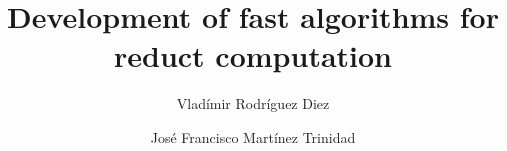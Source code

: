 \documentclass[authoryear,11pt]{elsarticle}
\begin{document}
	
	\title{Development of fast algorithms for reduct computation}
	
	\author{Vlad\'imir Rodr\'iguez Diez}
	\author{Jos\'e Francisco Mart\'inez Trinidad}
	
	\address{Computer Science Department\\National Institute of
	Astrophysics, Optics and Electronics\\
	Luis Enrique Erro \# 1, Santa Mar\'{\i}a Tonantzintla, Puebla,
	72840, M\'{e}xico} 
	
	
	
%	

	\maketitle


\end{document}
